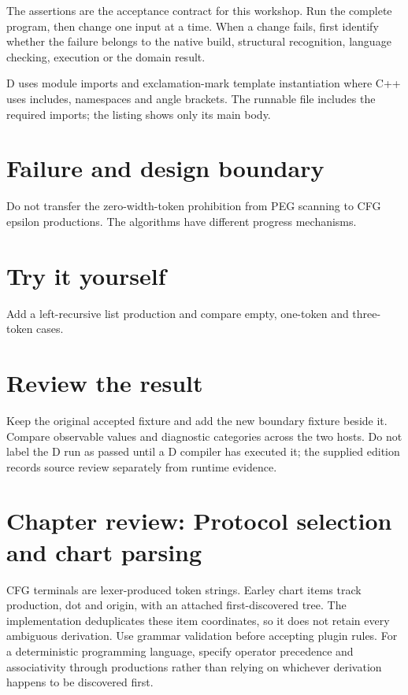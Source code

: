 The assertions are the acceptance contract for this workshop. Run the complete program, then change one input at a time. When a change fails, first identify whether the failure belongs to the native build, structural recognition, language checking, execution or the domain result.

\clearpage
{}
D uses module imports and exclamation-mark template instantiation where C++ uses includes, namespaces and angle brackets. The runnable file includes the required imports; the listing shows only its main body.


\section*{Failure and design boundary}
Do not transfer the zero-width-token prohibition from PEG scanning to CFG epsilon productions. The algorithms have different progress mechanisms.

\section*{Try it yourself}
Add a left-recursive list production and compare empty, one-token and three-token cases.

\section*{Review the result}
Keep the original accepted fixture and add the new boundary fixture beside it. Compare observable values and diagnostic categories across the two hosts. Do not label the D run as passed until a D compiler has executed it; the supplied edition records source review separately from runtime evidence.

\clearpage
\section*{Chapter review: Protocol selection and chart parsing}
CFG terminals are lexer-produced token strings. Earley chart items track production, dot and origin, with an attached first-discovered tree. The implementation deduplicates these item coordinates, so it does not retain every ambiguous derivation. Use grammar validation before accepting plugin rules. For a deterministic programming language, specify operator precedence and associativity through productions rather than relying on whichever derivation happens to be discovered first.


